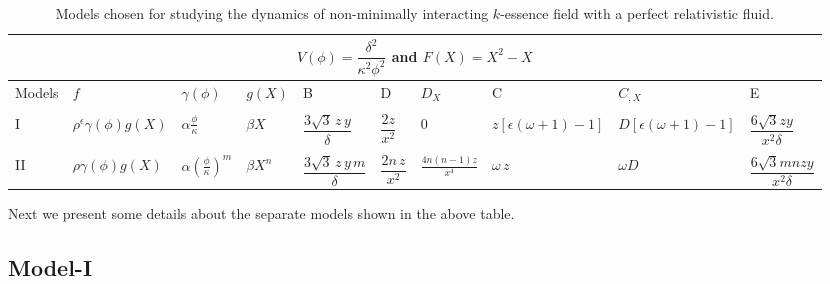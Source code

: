 \documentclass[a4paper,12pt]{article}
\begin{document}
\begin{table}[h!]
\centering
\begin{tabular}{|p{1.1cm}| p{2cm} |p{1cm}|p{0.8cm}|p{1.55cm}|p{0.8cm}|p{1.2cm}|p{1cm}|p{1.1cm}|p{1.8cm}|}
\hline 
\multicolumn{10}{|c|}{ $V(\phi) = \dfrac{\delta^2}{\kappa^2\phi^2}$ and $ F(X) = X^2 -X $ } \\
\hline
Models & $ f $ & $\gamma(\phi)$ & $ g(X) $  & B & D & $D_X$ & C & $C_{,X}$ & E\\
\hline
&&&&&&&&&\\
I & $\rho^\epsilon \gamma(\phi) g(X)$ &$ \alpha \frac{\phi}{\kappa}  $ &$\beta X$ & $ \dfrac{3\sqrt{3}\, z\, y}{\delta  }  $ & $ \dfrac{2z}{x^2} $ & 0 & $ z[\epsilon(\omega +1)-1] $ &$D[\epsilon(\omega +1)-1]  $ &$ \dfrac{6\sqrt{3}zy}{x^2 \delta } $\\
\hline
&&&&&&&&&\\
II & $\rho\gamma(\phi) g(X)$ & $\alpha \left( \frac{\phi}{\kappa}\right)^m  $& $ \beta X^n $& $ \dfrac{3\sqrt{3}\, z\, y\, m}{\delta  }  $  &  $ \dfrac{2n\,z}{x^2} $ & $\frac{4n(n-1)z}{x^4} $ & $\omega \, z$ &$\omega D$ &$\dfrac{6\sqrt{3} mnzy}{x^2 \delta } $\\
\hline   
\end{tabular}
\caption{Models chosen for studying the dynamics of non-minimally interacting $k$-essence field with a perfect relativistic fluid.}
\label{table:M0}
\end{table}	
Next we present some details about the separate models shown in the above table. 
\subsection{Model-I}
\end{document}
